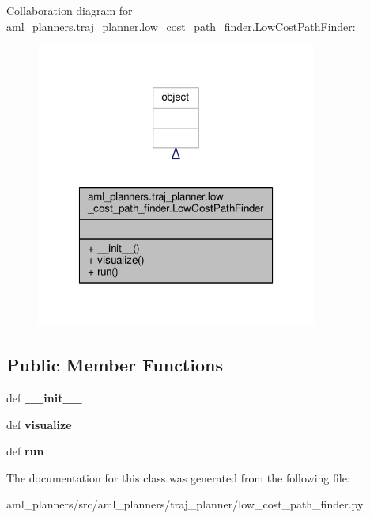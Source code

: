 Collaboration diagram for aml\-\_\-planners.\-traj\-\_\-planner.\-low\-\_\-cost\-\_\-path\-\_\-finder.\-Low\-Cost\-Path\-Finder\-:\nopagebreak
\begin{figure}[H]
\begin{center}
\leavevmode
\includegraphics[width=262pt]{classaml__planners_1_1traj__planner_1_1low__cost__path__finder_1_1_low_cost_path_finder__coll__graph}
\end{center}
\end{figure}
\subsection*{Public Member Functions}
\begin{DoxyCompactItemize}
\item 
\hypertarget{classaml__planners_1_1traj__planner_1_1low__cost__path__finder_1_1_low_cost_path_finder_af0e5ed346e1fb712c09c1c4fe831ba5d}{def {\bfseries \-\_\-\-\_\-init\-\_\-\-\_\-}}\label{classaml__planners_1_1traj__planner_1_1low__cost__path__finder_1_1_low_cost_path_finder_af0e5ed346e1fb712c09c1c4fe831ba5d}

\item 
\hypertarget{classaml__planners_1_1traj__planner_1_1low__cost__path__finder_1_1_low_cost_path_finder_ab5571f904feff61d315e327fe91910c3}{def {\bfseries visualize}}\label{classaml__planners_1_1traj__planner_1_1low__cost__path__finder_1_1_low_cost_path_finder_ab5571f904feff61d315e327fe91910c3}

\item 
\hypertarget{classaml__planners_1_1traj__planner_1_1low__cost__path__finder_1_1_low_cost_path_finder_a9dd635ff498420ec099313d0f9825743}{def {\bfseries run}}\label{classaml__planners_1_1traj__planner_1_1low__cost__path__finder_1_1_low_cost_path_finder_a9dd635ff498420ec099313d0f9825743}

\end{DoxyCompactItemize}


The documentation for this class was generated from the following file\-:\begin{DoxyCompactItemize}
\item 
aml\-\_\-planners/src/aml\-\_\-planners/traj\-\_\-planner/low\-\_\-cost\-\_\-path\-\_\-finder.\-py\end{DoxyCompactItemize}
